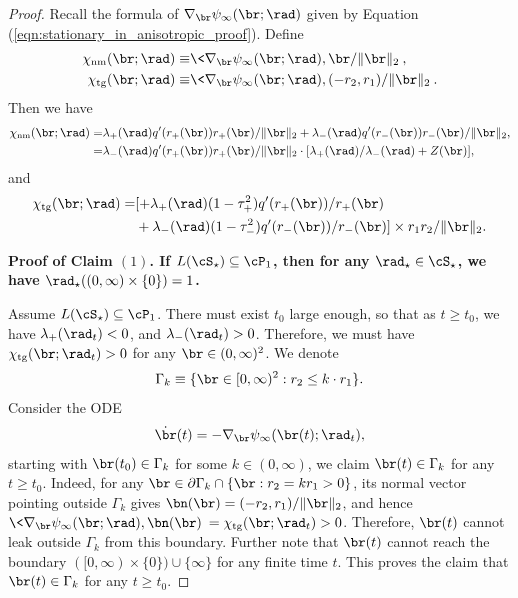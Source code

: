 \documentclass[11pt]{article}
\begin{document}
\begin{proof}
Recall the formula of $\nabla_\br \psi_\infty(\br; \rad)$ given by Equation (\ref{eqn:stationary_in_anisotropic_proof}). Define 
\begin{align}
\chi_{\rm nm}(\br; \rad) \equiv& \<\nabla_\br \psi_\infty(\br; \rad) ,\br/ \| \br \|_2\>,\\
\chi_{\rm tg}(\br; \rad) \equiv& \<\nabla_\br \psi_\infty(\br; \rad), (- r_2, r_1)/ \| \br \|_2\>.
\end{align}
Then we have
\begin{equation}\label{eqn:NormalGradient_in_anisotropic_proof}
\begin{aligned}
\chi_{\rm nm}(\br; \rad) =& \lambda_+(\rad) q'(r_+(\br)) r_+(\br) / \| \br \|_2 + \lambda_-(\rad) q'(r_-(\br)) r_-(\br) / \| \br \|_2, \\
=& \lambda_-(\rad) q'(r_+(\br)) r_+(\br) / \| \br \|_2 \cdot [\lambda_+(\rad) / \lambda_-(\rad) + Z(\br)],
\end{aligned}
\end{equation}
and
\begin{equation}\label{eqn:TangentGradient_in_anisotropic_proof}
\begin{aligned}
\chi_{\rm tg}(\br; \rad) =& [+\lambda_+(\rad) (1 - \tau_{+}^2) q'(r_+(\br)) / r_+(\br) \\
&+ \lambda_-(\rad) (1 - \tau_{-}^2)  q'(r_-(\br)) / r_-(\br)]  \times r_1 r_2/ \|\br \|_2. 
\end{aligned}
\end{equation}

\vskip 0.2cm
\noindent
{\bf Proof of Claim $(1)$. If $L(\cS_\star) \subseteq \cP_1$, then for any $\rad_\star \in \cS_\star$, we have $\rad_\star( (0, \infty) \times \{0\} ) = 1$. }  

Assume $L(\cS_\star) \subseteq \cP_1$. There must exist $t_0$ large enough, so that as $t \ge t_0$, we have $\lambda_+(\rad_t) < 0$, and $\lambda_-(\rad_t) > 0$. Therefore, we must have $\chi_{\rm tg}(\br; \rad_t) > 0$ for any $\br \in (0, \infty)^2$. We denote
\begin{equation}\label{eqn:Gamma_area_in_anisotropic_proof_case1}
\Gamma_k \equiv \{\br \in [0, \infty)^2: r_2 \le k \cdot r_1 \}.
\end{equation}
Consider the ODE 
\begin{align}\label{eqn:ODE_in_anisotropic_proof}
\dot \br(t) = - \nabla_{\br} \psi_\infty(\br(t); \rad_t),
\end{align}
starting with $\br(t_0) \in \Gamma_k$ for some $k \in (0, \infty)$, we claim $\br(t) \in \Gamma_k$ for any $t \ge t_0$. Indeed, for any $\br \in \partial \Gamma_k \cap \{ \br: r_2 = k r_1 > 0\}$, its normal vector pointing outside $\Gamma_k$ gives $\bn(\br) = (-r_2, r_1)/ \| \br \|_2$, and hence $\<\nabla_\br \psi_\infty(\br; \rad), \bn(\br)\>  =  \chi_{\rm tg}(\br; \rad_t) > 0$. Therefore, $\br(t)$ cannot leak outside $\Gamma_k$ from this boundary. Further note that $\br(t)$ cannot reach the boundary $([0, \infty) \times \{ 0 \}) \cup \{ \infty \}$ for any finite time $t$. This proves the claim that $\br(t) \in \Gamma_k$ for any $t \ge t_0$. 


\end{proof}
\end{document}
